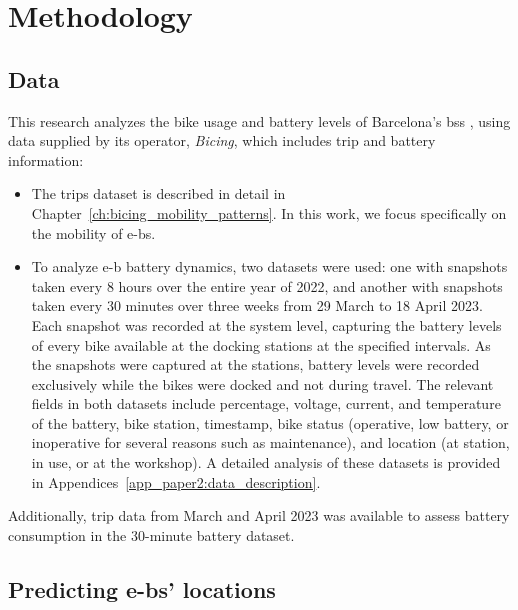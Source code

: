 \section{Methodology}
\label{sec:battery_methodology}

    \subsection{Data}

    This research analyzes the bike usage and battery levels of Barcelona's \ac{bss} \cite{Soriguera2018, Winslow2019, Grau-Escolano2024}, using data supplied by its operator, \textit{Bicing}, which includes trip and battery information:

      \begin{itemize}
        \item The trips dataset is described in detail in Chapter~\ref{ch:bicing_mobility_patterns}. In this work, we focus specifically on the mobility of \acp{e-b}.

        \item To analyze \ac{e-b} battery dynamics, two datasets were used: one with snapshots taken every 8 hours over the entire year of 2022, and another with snapshots taken every 30 minutes over three weeks from 29 March to 18 April 2023. Each snapshot was recorded at the system level, capturing the battery levels of every bike available at the docking stations at the specified intervals. As the snapshots were captured at the stations, battery levels were recorded exclusively while the bikes were docked and not during travel. The relevant fields in both datasets include percentage, voltage, current, and temperature of the battery, bike station, timestamp, bike status (operative, low battery, or inoperative for several reasons such as maintenance), and location (at station, in use, or at the workshop). A detailed analysis of these datasets is provided in Appendices~\ref{app_paper2:data_description}.
      \end{itemize}

    Additionally, trip data from March and April 2023 was available to assess battery consumption in the 30-minute battery dataset.



    \subsection[Predicting e-bikes' locations]{Predicting \acp{e-b}' locations}

